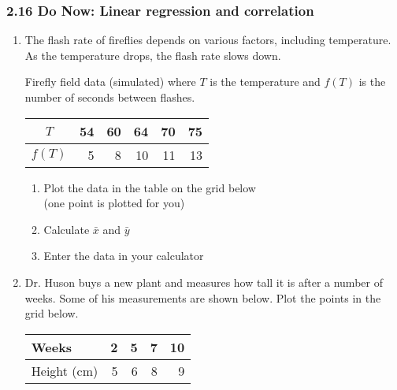 \documentclass[12pt, twoside]{article}
\begin{document}
\subsubsection*{2.16 Do Now: Linear regression and correlation}
\begin{enumerate}

  \item The flash rate of fireflies depends on various factors, including temperature. As the temperature drops, the flash rate slows down.
  
  Firefly field data (simulated) where $T$ is the temperature and $f(T)$ is the number of seconds between flashes. \\[10pt]
  \begin{tabular}{|c|r|r|r|r|r|}
  \hline
  $T$ & 54 & 60 & 64 & 70 & 75 \\ [3pt]
  \hline
  $f(T)$ & 5 & 8 & 10 & 11 & 13  \\  [3pt]
  \hline
  \end{tabular}
  \begin{enumerate}
      \item Plot the data in the table on the grid below \\
      (one point is plotted for you)
      \item Calculate $\bar{x}$ and $\bar{y}$
      \item Enter the data in your calculator
  \end{enumerate} \vspace{1in}
  
\newpage
\item Dr. Huson buys a new plant and measures how tall it is after a number of weeks. Some of his measurements are shown below. Plot the points in the grid below.
  \renewcommand{\arraystretch}{1.6}
    \begin{center}
      \begin{tabular}{|l|r|r|r|r|}
      \hline
      Weeks & 2 & 5 & 7 & 10\\
      \hline
      Height (cm) & 5 & 6 & 8 & 9 \\
      \hline
      \end{tabular}
    \end{center}


\end{enumerate}
\end{document}

